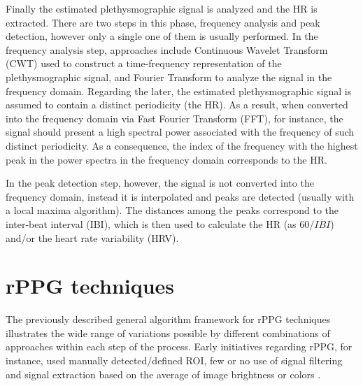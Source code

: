 Finally the estimated plethysmographic signal is analyzed and the HR is extracted. There are two steps in this phase, frequency analysis and peak detection, however only a single one of them is usually performed. In the frequency analysis step, approaches include Continuous Wavelet Transform (CWT) used to construct a time-frequency representation of the plethysmographic signal, and Fourier Transform to analyze the signal in the frequency domain. Regarding the later, the estimated plethysmographic signal is assumed to contain a distinct periodicity (the HR). As a result, when converted into the frequency domain via Fast Fourier Transform (FFT), for instance, the signal should present a high spectral power associated with the frequency of such distinct periodicity. As a consequence, the index of the frequency with the highest peak in the power spectra in the frequency domain corresponds to the HR.

In the peak detection step, however, the signal is not converted into the frequency domain, instead it is interpolated and peaks are detected (usually with a local maxima algorithm). The distances among the peaks correspond to the inter-beat interval (IBI), which is then used to calculate the HR (as $60/\overline{IBI}$) and/or the heart rate variability (HRV).

\section{rPPG techniques}

The previously described general algorithm framework for rPPG techniques illustrates the wide range of variations possible by different combinations of approaches within each step of the process. Early initiatives regarding rPPG, for instance, used manually detected/defined ROI, few or no use of signal filtering and signal extraction based on the average of image brightness \parencite{takano2007heart} or colors \parencite{verkruysse2008remote}.

